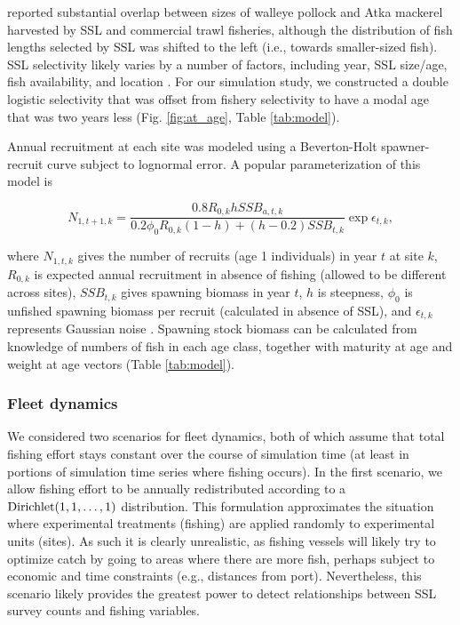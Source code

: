 \documentclass[nonumbib,leqno]{nrc1}
\begin{document}
\citet{ZeppelinEtAl2004} reported substantial overlap between sizes of walleye pollock and Atka mackerel harvested by SSL and commercial trawl fisheries, although the distribution of fish lengths selected by SSL was shifted to the left (i.e., towards smaller-sized fish).  SSL selectivity likely varies by a number of factors, including year, SSL size/age, fish availability, and location \citep{ZeppelinEtAl2004}.  For our simulation study, we constructed a double logistic selectivity that was offset from fishery selectivity to have a modal age that was two years less (Fig. \ref{fig:at_age}, Table \ref{tab:model}).

Annual recruitment at each site was modeled using a Beverton-Holt spawner-recruit curve subject to lognormal error.  A popular parameterization of this model is
\begin{linenomath}
\begin{equation*}
N_{1,t+1,k} = \frac{0.8 R_{0,k} h SSB_{a,t,k}}{0.2 \phi_0 R_{0,k}(1-h)+(h-0.2)SSB_{t,k}} \exp{\epsilon_{t,k}},
\end{equation*}
\end{linenomath}
where $N_{1,t,k}$ gives the number of recruits (age 1 individuals) in year $t$ at site $k$, $R_{0,k}$ is expected annual recruitment in absence of fishing (allowed to be different across sites), $SSB_{t,k}$ gives spawning biomass in year $t$, $h$ is steepness, $\phi_0$ is unfished spawning biomass per recruit (calculated in absence of SSL), and $\epsilon_{t,k}$ represents Gaussian noise \citep{Mace1988}.  Spawning stock biomass can be calculated from knowledge of numbers of fish in each age class, together with maturity at age and weight at age vectors (Table \ref{tab:model}).

\subsubsection{Fleet dynamics}
\label{section:Fleet}

We considered two scenarios for fleet dynamics, both of which assume that total fishing effort stays constant
over the course of simulation time (at least in portions of simulation time series where fishing occurs).  In the first scenario, we allow fishing effort to be annually redistributed according to a ${\rm Dirichlet}(1,1,\hdots,1)$ distribution.  This formulation approximates the situation where experimental treatments (fishing) are applied randomly to experimental units (sites).  As such it is clearly unrealistic, as fishing vessels will likely try to optimize catch by going to areas where there are more fish, perhaps subject
to economic and time constraints (e.g., distances from port).  Nevertheless, this scenario likely provides the greatest power to detect relationships between SSL survey counts and fishing variables.
\end{document}
